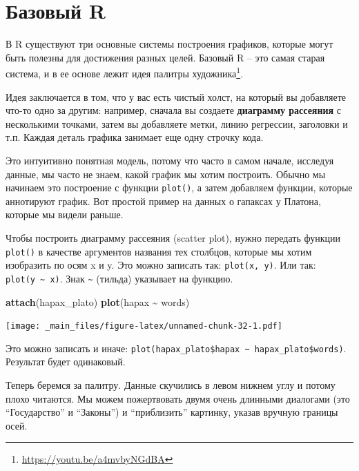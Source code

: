 \documentclass[
]{book}
\newenvironment{Shaded}{\begin{snugshade}}{\end{snugshade}}
\newcommand{\FunctionTok}[1]{\textcolor[rgb]{0.13,0.29,0.53}{\textbf{#1}}}
\newcommand{\NormalTok}[1]{#1}
\newcommand{\SpecialCharTok}[1]{\textcolor[rgb]{0.81,0.36,0.00}{\textbf{#1}}}
\theoremstyle{definition}
\theoremstyle{definition}
\theoremstyle{definition}
\theoremstyle{definition}
\theoremstyle{remark}
\begin{document}
\hypertarget{ux431ux430ux437ux43eux432ux44bux439-r}{%
\section{Базовый R}\label{ux431ux430ux437ux43eux432ux44bux439-r}}

В R существуют три основные системы построения графиков, которые могут быть полезны для достижения разных целей. Базовый R -- это самая старая система, и в ее основе лежит идея палитры художника\footnote{\url{https://youtu.be/a4mvbyNGdBA}}.

Идея заключается в том, что у вас есть чистый холст, на который вы добавляете что-то одно за другим: например, сначала вы создаете \textbf{диаграмму рассеяния} с несколькими точками, затем вы добавляете метки, линию регрессии, заголовки и т.п. Каждая деталь графика занимает еще одну строчку кода.

Это интуитивно понятная модель, потому что часто в самом начале, исследуя данные, мы часто не знаем, какой график мы хотим построить. Обычно мы начинаем это построение с функции \texttt{plot()}, а затем добавляем функции, которые аннотируют график. Вот простой пример на данных о гапаксах у Платона, которые мы видели раньше.

Чтобы построить диаграмму рассеяния (scatter plot), нужно передать функции \texttt{plot()} в качестве аргументов названия тех столбцов, которые мы хотим изобразить по осям x и y. Это можно записать так: \texttt{plot(x,\ y)}. Или так: \texttt{plot(y\ \textasciitilde{}\ x)}. Знак \texttt{\textasciitilde{}} (тильда) указывает на функцию.

\begin{Shaded}
\begin{Highlighting}[]
\FunctionTok{attach}\NormalTok{(hapax\_plato)}
\FunctionTok{plot}\NormalTok{(hapax }\SpecialCharTok{\textasciitilde{}}\NormalTok{ words)}
\end{Highlighting}
\end{Shaded}

\texttt{[image: \_main\_files/figure-latex/unnamed-chunk-32-1.pdf]}

Это можно записать и иначе: \texttt{plot(hapax\_plato\$hapax\ \textasciitilde{}\ hapax\_plato\$words)}. Результат будет одинаковый.

Теперь беремся за палитру. Данные скучились в левом нижнем углу и потому плохо читаются. Мы можем пожертвовать двумя очень длинными диалогами (это ``Государство'' и ``Законы'') и ``приблизить'' картинку, указав вручную границы осей.
\end{document}
